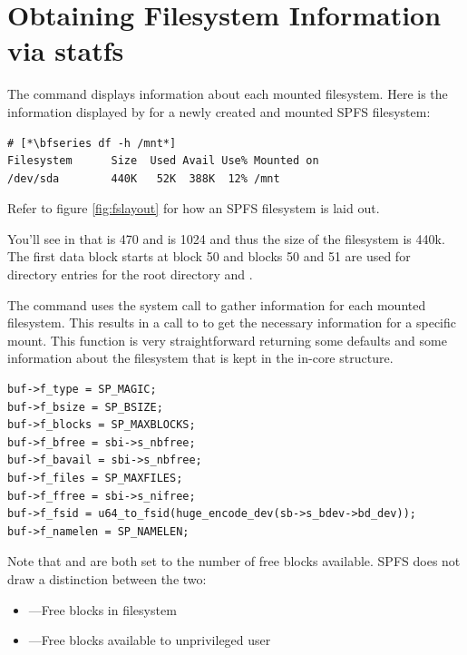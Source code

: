 
\section{Obtaining Filesystem Information via statfs}

The  command displays information about each mounted filesystem. Here is the information displayed by  for a newly created and mounted SPFS filesystem:

\begin{lstlisting}
# [*\bfseries df -h /mnt*]
Filesystem      Size  Used Avail Use% Mounted on
/dev/sda        440K   52K  388K  12% /mnt
\end{lstlisting}

\noindent
Refer to figure \ref{fig:fslayout} for how an SPFS filesystem is laid out.

You'll see in  that  is 470 and   is 1024 and thus the size of the filesystem is 440k. The first data block starts at block 50 and blocks 50 and 51 are used for directory entries for the root directory and . 

The  command uses the  system call to gather information for each mounted filesystem. This results in a call to  to get the necessary information for a specific mount. This function is very straightforward returning some defaults and some information about the filesystem that is kept in the in-core  structure.

\begin{lstlisting}
buf->f_type = SP_MAGIC;
buf->f_bsize = SP_BSIZE;
buf->f_blocks = SP_MAXBLOCKS;
buf->f_bfree = sbi->s_nbfree;
buf->f_bavail = sbi->s_nbfree; 
buf->f_files = SP_MAXFILES; 
buf->f_ffree = sbi->s_nifree;
buf->f_fsid = u64_to_fsid(huge_encode_dev(sb->s_bdev->bd_dev));
buf->f_namelen = SP_NAMELEN;
\end{lstlisting}

\noindent
Note that  and  are both set to the number of free blocks available. SPFS does not draw a distinction between the two:

\begin{itemize}
	\item {}---Free blocks in filesystem
	\item {}---Free blocks available to unprivileged user
\end{itemize}

